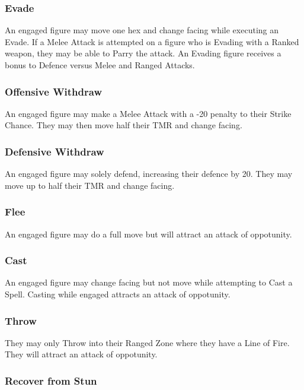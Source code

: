 \begin{multicols*}{3}
\subsubsection{Evade}

An engaged figure may move one hex and change facing while executing
an Evade. If a Melee Attack is attempted on a figure who is Evading
with a Ranked weapon, they may be able to Parry the attack. An Evading
figure receives a bonus to Defence versus Melee and Ranged Attacks.

\subsubsection{Offensive Withdraw}

An engaged figure may make a Melee Attack with a -20 penalty to their
Strike Chance. They may then move half their TMR and change facing.

\subsubsection{Defensive Withdraw}

An engaged figure may solely defend, increasing their defence by
20. They may move up to half their TMR and change facing.

\subsubsection{Flee}

An engaged figure may do a full move but will attract an attack of
oppotunity.

\subsubsection{Cast}

An engaged figure may change facing but not move while attempting to
Cast a Spell.  Casting while engaged attracts an attack of oppotunity.

\subsubsection{Throw}

They may only Throw into their Ranged Zone where they have a Line of
Fire.  They will attract an attack of oppotunity.

\subsubsection{Recover from Stun}


\end{multicols*}
